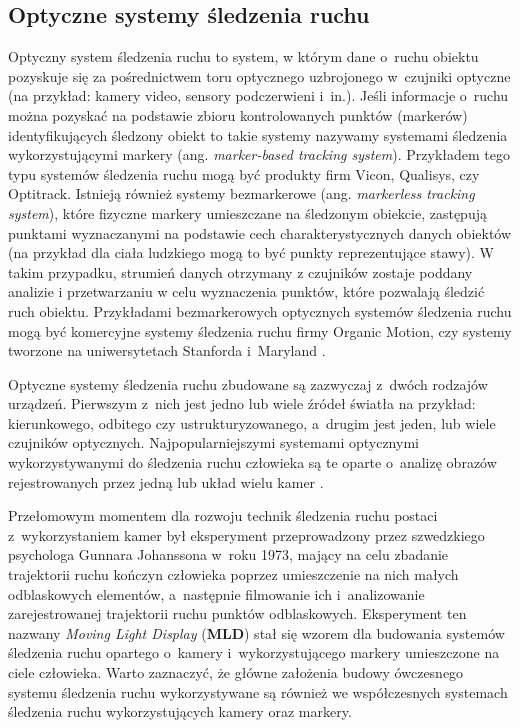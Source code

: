 \subsection{Optyczne systemy śledzenia ruchu}
Optyczny system śledzenia ruchu to system, w którym dane o~ruchu obiektu pozyskuje się za pośrednictwem toru optycznego uzbrojonego w~czujniki optyczne (na przykład: kamery video, sensory podczerwieni i~in.). Jeśli informacje o~ruchu można pozyskać na podstawie zbioru kontrolowanych punktów (markerów) identyfikujących śledzony obiekt to takie systemy nazywamy systemami śledzenia wykorzystującymi markery (ang. \textsl{marker-based tracking system}). Przykładem tego typu systemów śledzenia ruchu mogą być produkty firm Vicon{}, Qualisys{}, czy Optitrack{}. Istnieją również systemy bezmarkerowe (ang. \textsl{markerless tracking system}), które fizyczne markery umieszczane na śledzonym obiekcie, zastępują punktami wyznaczanymi na podstawie cech charakterystycznych danych obiektów (na przykład dla ciała ludzkiego mogą to być punkty reprezentujące stawy). W takim przypadku, strumień danych otrzymany z czujników zostaje poddany analizie i przetwarzaniu w celu wyznaczenia punktów, które pozwalają śledzić ruch obiektu. Przykładami bezmarkerowych optycznych systemów śledzenia ruchu mogą być komercyjne systemy śledzenia ruchu firmy Organic Motion{}, czy systemy tworzone na uniwersytetach Stanforda i~Maryland \cite{Sundaresan2005,Sundaresan2007}.

Optyczne systemy śledzenia ruchu zbudowane są zazwyczaj z~dwóch rodzajów urządzeń. Pierwszym z~nich jest jedno lub wiele źródeł światła na przykład: kierunkowego, odbitego czy ustrukturyzowanego, a~drugim jest jeden, lub wiele czujników optycznych. Najpopularniejszymi systemami optycznymi wykorzystywanymi do śledzenia ruchu człowieka są te oparte o~analizę obrazów rejestrowanych przez jedną \cite{schmidt2006kernel,RuiLi2006} lub układ wielu kamer \cite{Sundaresan2005,Krzeszowski2013}.

Przełomowym momentem dla rozwoju technik śledzenia ruchu postaci z~wykorzystaniem kamer był eksperyment przeprowadzony przez szwedzkiego psychologa Gunnara Johanssona w~roku 1973, mający na celu zbadanie trajektorii ruchu kończyn człowieka poprzez umieszczenie na nich małych odblaskowych elementów, a~następnie filmowanie ich i~analizowanie zarejestrowanej trajektorii ruchu punktów odblaskowych. Eksperyment ten nazwany \emph{Moving Light Display} (\textbf{MLD}) \cite{Johansson1973} stał się wzorem dla budowania systemów śledzenia ruchu opartego o~kamery i~wykorzystującego markery umieszczone na ciele człowieka. Warto zaznaczyć, że główne założenia budowy ówczesnego systemu śledzenia ruchu wykorzystywane są również we współczesnych systemach śledzenia ruchu wykorzystujących kamery oraz markery.

